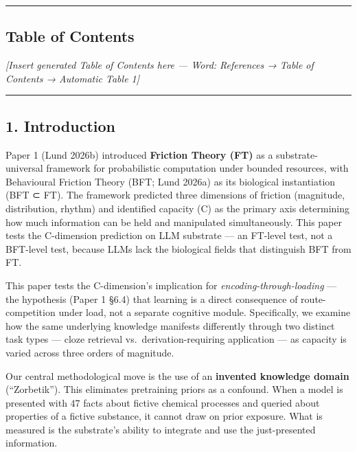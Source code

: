 \documentclass[
]{article}
\begin{document}
\begin{center}\rule{0.5\linewidth}{0.5pt}\end{center}

\subsection{Table of Contents}\label{table-of-contents}

\emph{{[}Insert generated Table of Contents here --- Word: References →
Table of Contents → Automatic Table 1{]}}

\begin{center}\rule{0.5\linewidth}{0.5pt}\end{center}

\subsection{1. Introduction}\label{introduction}

Paper 1 (Lund 2026b) introduced \textbf{Friction Theory (FT)} as a
substrate-universal framework for probabilistic computation under
bounded resources, with Behavioural Friction Theory (BFT; Lund 2026a) as
its biological instantiation (BFT ⊂ FT). The framework predicted three
dimensions of friction (magnitude, distribution, rhythm) and identified
capacity (C) as the primary axis determining how much information can be
held and manipulated simultaneously. This paper tests the C-dimension
prediction on LLM substrate --- an FT-level test, not a BFT-level test,
because LLMs lack the biological fields that distinguish BFT from FT.

This paper tests the C-dimension's implication for
\emph{encoding-through-loading} --- the hypothesis (Paper 1 §6.4) that
learning is a direct consequence of route-competition under load, not a
separate cognitive module. Specifically, we examine how the same
underlying knowledge manifests differently through two distinct task
types --- cloze retrieval vs.~derivation-requiring application --- as
capacity is varied across three orders of magnitude.

Our central methodological move is the use of an \textbf{invented
knowledge domain} (``Zorbetik''). This eliminates pretraining priors as
a confound. When a model is presented with 47 facts about fictive
chemical processes and queried about properties of a fictive substance,
it cannot draw on prior exposure. What is measured is the substrate's
ability to integrate and use the just-presented information.
\end{document}
